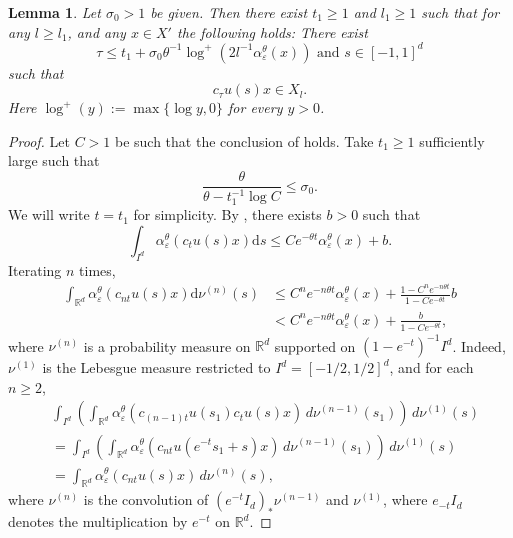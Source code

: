 \documentclass[10pt,a4paper]{amsart}
\newtheorem{lem}{Lemma}
\newcommand{\R}{\mathbb{R}}
\newcommand{\de}{\mathrm{d}}
\newcommand{\eps}{\varepsilon}
\begin{document}
\begin{lem} \label{lem:back to compact}
        Let $\sigma_0>1$ be given. Then there exist $t_1\geq 1$ and $l_1\geq 1$ such that for any $l\geq l_1$, and any $x\in X'$ the following holds: There exist 
        \[
        \tau\leq t_1+\sigma_0\theta^{-1}\log^+ (2l^{-1}\alpha_\eps^\theta(x)) \text{ and } s\in [-1,1]^d
        \]
        such that
        \[
        c_{\tau}u(s)x \in X_l.  
        \]
        Here $\log^+(y):=\max\{ \log y,0 \}$ for every $y>0$.
    \end{lem}

    \begin{proof}
       Let $C>1$ be such that the conclusion of  holds. Take $t_1\geq 1$ sufficiently large such that 
        \[
        \frac{\theta}{\theta-t_1^{-1}\log C}\leq\sigma_0.
        \]
        We will write $t=t_1$ for simplicity. By , there exists $b>0$ such that 
        \[
        \int_{I^d}\alpha_\eps^{\theta}(c_tu(s)x)\de s\leq
		Ce^{-\theta t}\alpha_\eps^{\theta}(x)+b.
        \]
        Iterating $n$ times,
        \begin{equation} \label{eq:exponential contraction}
        \begin{split}
            \int_{\R^d}\alpha_\eps^{\theta}(c_{nt}u(s)x)\de \nu^{(n)}(s)
            &\leq C^ne^{-n\theta t}\alpha_\eps^{\theta}(x)+\frac{1-C^ne^{-n\theta t}}{1-Ce^{-\theta t}}b \\
            &< C^ne^{-n\theta t}\alpha_\eps^{\theta}(x)+\frac{b}{1-Ce^{-\theta t}},
        \end{split}    
        \end{equation}
        where $\nu^{(n)}$ is a probability measure on $\R^d$ supported on $(1-e^{-t})^{-1}I^d$. Indeed, $\nu^{(1)}$ is the Lebesgue measure restricted to $I^d=[-1/2,1/2]^d$, and for each $n\geq 2$,
        \begin{align*}
&\int_{I^d}\left(\int_{\R^d}\alpha_\eps^\theta(c_{(n-1)t}u(s_1)c_{t}u(s)x)\,d\nu^{(n-1)}(s_1)\right)\,d\nu^{(1)}(s)\\
&=\int_{I^d}\left(\int_{\R^d}\alpha_\eps^\theta(c_{nt}u(e^{-t}s_1+s)x)\,d\nu^{(n-1)}(s_1)\right)\,d\nu^{(1)}(s)\\
&=\int_{\R^d}\alpha_\eps^{\theta}(c_{nt}u(s)x)\,d\nu^{(n)}(s),
\end{align*}
    where $\nu^{(n)}$ is the convolution of $(e^{-t}I_d)_\ast \nu^{(n-1)}$ and $\nu^{(1)}$, where $e_{-t}I_d$ denotes the multiplication by $e^{-t}$ on $\R^d$. 


\end{proof}
\end{document}
